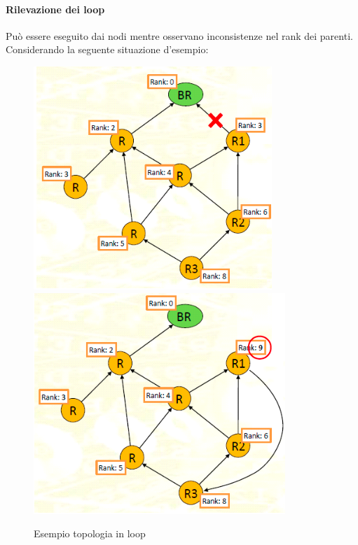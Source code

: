 \documentclass{article}
\begin{document}
\paragraph{Rilevazione dei loop} Può essere eseguito dai nodi mentre osservano inconsistenze nel rank dei parenti. Considerando la seguente situazione d'esempio:
\begin{figure}[H]
\centering
\includegraphics[scale=0.4]{figures/loop example.png}
\includegraphics[scale=0.4]{figures/loop example 2.png}
\caption{Esempio topologia in loop}
\end{figure}
\end{document}
